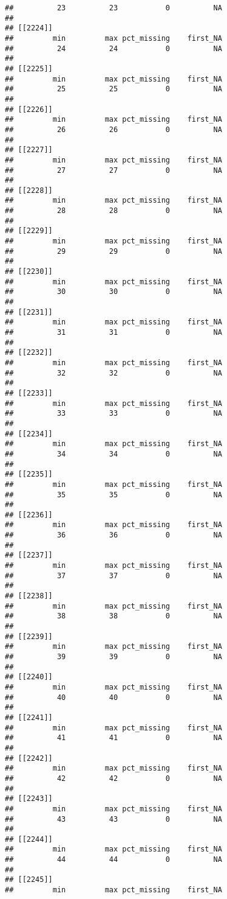 \documentclass[
]{article}
\begin{document}
\begin{verbatim}
##          23          23           0          NA 
## 
## [[2224]]
##         min         max pct_missing    first_NA 
##          24          24           0          NA 
## 
## [[2225]]
##         min         max pct_missing    first_NA 
##          25          25           0          NA 
## 
## [[2226]]
##         min         max pct_missing    first_NA 
##          26          26           0          NA 
## 
## [[2227]]
##         min         max pct_missing    first_NA 
##          27          27           0          NA 
## 
## [[2228]]
##         min         max pct_missing    first_NA 
##          28          28           0          NA 
## 
## [[2229]]
##         min         max pct_missing    first_NA 
##          29          29           0          NA 
## 
## [[2230]]
##         min         max pct_missing    first_NA 
##          30          30           0          NA 
## 
## [[2231]]
##         min         max pct_missing    first_NA 
##          31          31           0          NA 
## 
## [[2232]]
##         min         max pct_missing    first_NA 
##          32          32           0          NA 
## 
## [[2233]]
##         min         max pct_missing    first_NA 
##          33          33           0          NA 
## 
## [[2234]]
##         min         max pct_missing    first_NA 
##          34          34           0          NA 
## 
## [[2235]]
##         min         max pct_missing    first_NA 
##          35          35           0          NA 
## 
## [[2236]]
##         min         max pct_missing    first_NA 
##          36          36           0          NA 
## 
## [[2237]]
##         min         max pct_missing    first_NA 
##          37          37           0          NA 
## 
## [[2238]]
##         min         max pct_missing    first_NA 
##          38          38           0          NA 
## 
## [[2239]]
##         min         max pct_missing    first_NA 
##          39          39           0          NA 
## 
## [[2240]]
##         min         max pct_missing    first_NA 
##          40          40           0          NA 
## 
## [[2241]]
##         min         max pct_missing    first_NA 
##          41          41           0          NA 
## 
## [[2242]]
##         min         max pct_missing    first_NA 
##          42          42           0          NA 
## 
## [[2243]]
##         min         max pct_missing    first_NA 
##          43          43           0          NA 
## 
## [[2244]]
##         min         max pct_missing    first_NA 
##          44          44           0          NA 
## 
## [[2245]]
##         min         max pct_missing    first_NA 

\end{verbatim}
\end{document}
